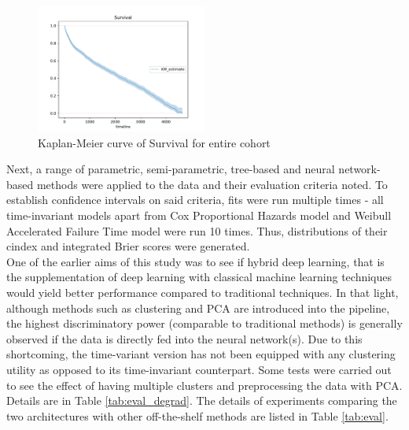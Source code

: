 \documentclass[%
 twocolumn,
 reprint,
 amsmath,amssymb,
 aps,nofootinbib
]{revtex4-2}
\begin{document}
\begin{figure}
  \centering
  \includegraphics[width=0.5\textwidth]{km_curve.pdf}
  \caption[KM curve]{Kaplan-Meier curve of Survival for entire cohort}
  \label{fig:km_curve}
\end{figure}

Next, a range of parametric, semi-parametric, tree-based and neural network-based methods were applied to the data and their evaluation criteria noted. To establish confidence intervals on said criteria, fits were run multiple times - all time-invariant models apart from Cox Proportional Hazards model and Weibull Accelerated Failure Time model were run 10 times. Thus, distributions of their cindex and integrated Brier scores were generated. \\

One of the earlier aims of this study was to see if hybrid deep learning, that is the supplementation of deep learning with classical machine learning techniques would yield better performance compared to traditional techniques. In that light, although methods such as clustering and PCA are introduced into the pipeline, the highest discriminatory power (comparable to traditional methods) is generally observed if the data is directly fed into the neural network(s). Due to this shortcoming, the time-variant version has not been equipped with any clustering utility as opposed to its time-invariant counterpart. Some tests were carried out to see the effect of having multiple clusters and preprocessing the data with PCA. Details are in Table \ref{tab:eval_degrad}. The details of experiments comparing the two architectures with other off-the-shelf methods are listed in Table \ref{tab:eval}.\\
\end{document}

